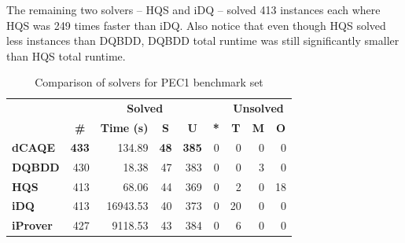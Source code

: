 \documentclass[
  digital, %
  color,
  twoside, %
  table,   %
  nolof,     %
  nolot,     %
]{fithesis3}
\theoremstyle{definition}
\theoremstyle{remark}
\begin{document}
The remaining two solvers -- HQS and iDQ -- solved 413 instances each where HQS was 249 times faster than iDQ. Also notice that even though HQS solved less instances than DQBDD, DQBDD total runtime was still significantly smaller than HQS total runtime.

\begin{table}[ht]
\centering
\caption{Comparison of solvers for PEC1 benchmark set}%
\label{tab:PEC1}
\begin{tabular}{|l|r|r|r|r|r|r|r|r|}
\hline
\multicolumn{1}{|c|}{}                                  & \multicolumn{5}{c|}{\textbf{Solved}}                                                                                                                                        & \multicolumn{3}{c|}{\textbf{Unsolved}}                                                                 \\  \hhline{~*{8}{-}}
\multicolumn{1}{|c|}{\multirow{-2}{*}{\textbf{Solver}}} & \multicolumn{1}{c|}{\textbf{\#}} & \multicolumn{1}{c|}{\textbf{Time (s)}} & \multicolumn{1}{c|}{\textbf{S}} & \multicolumn{1}{c|}{\textbf{U}} & \multicolumn{1}{c|}{\textbf{*}} & \multicolumn{1}{c|}{\textbf{T}} & \multicolumn{1}{c|}{\textbf{M}} & \multicolumn{1}{c|}{\textbf{O}} \\ \hline
\textbf{dCAQE} & \textbf{433} & \num{134.89} & \phantom{0}\textbf{48} & \textbf{385} & \phantom{00}\num{0} & \phantom{00}\num{0} & \phantom{00}\num{0} & \phantom{00}\num{0} \\ \hline
\textbf{DQBDD} & \num{430} & \num{18.38} & \num{47} & \num{383} & \num{0} & \num{0} & \num{3} & \num{0} \\ \hline
\textbf{HQS} & \num{413} & \num{68.06} & \num{44} & \num{369} & \num{0} & \num{2} & \num{0} & \num{18} \\ \hline
\textbf{iDQ} & \num{413} & \num{16943.53} & \num{40} & \num{373} & \num{0} & \num{20} & \num{0} & \num{0} \\ \hline
\textbf{iProver} & \num{427} & \num{9118.53} & \num{43} & \num{384} & \num{0} & \num{6} & \num{0} & \num{0} \\ \hline
\end{tabular}
\end{table}
\end{document}
